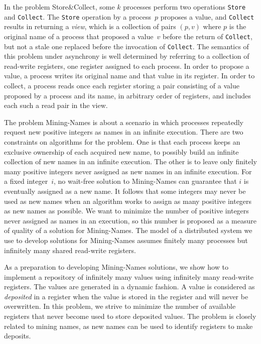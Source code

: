 \documentclass[11pt]{article}
\begin{document}
In the problem Store\&Collect, some $k$ processes perform two operations \texttt{Store} and \texttt{Collect}.
The \texttt{Store} operation by a process~$p$ proposes a value, and \texttt{Collect} results in returning a \emph{view}, which is a collection of pairs $(p,v)$ where $p$ is the original name of a process that proposed a value~$v$ before the return of \texttt{Collect}, but not a stale one replaced before the invocation of \texttt{Collect}.
The semantics of this problem under asynchrony is well determined by referring to a collection of read-write registers, one register assigned to each process.
In order to propose a value, a process writes its original name and that value in its register.
In order to collect, a process reads once each register storing a pair consisting of a value proposed by a process and its name, in arbitrary order of registers, and includes each such a read pair in the view.

The problem Mining-Names is about a scenario in which processes repeatedly request new positive integers as names in an infinite execution.
There are two constraints on algorithms for the problem. 
One is that each process keeps an exclusive ownership of each acquired new name, to possibly build an infinite collection of new names in an infinite execution.
The other is to leave only finitely many positive integers never assigned as new names in an infinite execution. 
For a fixed integer~$i$, no wait-free solution to Mining-Names can guarantee that $i$ is eventually assigned as a new name.
It follows that some integers may never be used as new names when an algorithm works to assign as many positive integers as new names as possible.
We want to minimize the number of positive integers never assigned as names in an execution, so this number  is proposed as a measure of quality of a solution for Mining-Names.
The model of a distributed system we use to develop solutions for Mining-Names assumes finitely many processes but infinitely many shared read-write registers.


As a preparation to developing Mining-Names solutions, we show how  to implement a repository of infinitely many values using infinitely many  read-write registers. 
The values are generated in a dynamic fashion.
A value is considered as \emph{deposited} in a register when the value is stored in the  register and will never be overwritten.
In this problem, we strive to minimize the number of available registers  that never become used to store deposited values.
The problem is closely related to mining names, as new names can be used to identify registers to make deposits.
\end{document}
